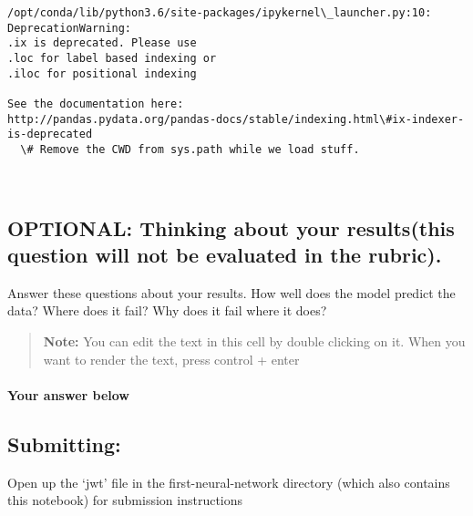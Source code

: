 \documentclass[11pt]{article}
\begin{document}
    \begin{Verbatim}[commandchars=\\\{\}]
/opt/conda/lib/python3.6/site-packages/ipykernel\_launcher.py:10: DeprecationWarning: 
.ix is deprecated. Please use
.loc for label based indexing or
.iloc for positional indexing

See the documentation here:
http://pandas.pydata.org/pandas-docs/stable/indexing.html\#ix-indexer-is-deprecated
  \# Remove the CWD from sys.path while we load stuff.

    \end{Verbatim}

    \begin{center}
    \end{center}
    { \hspace*{\fill} \\}
    
    \hypertarget{optional-thinking-about-your-resultsthis-question-will-not-be-evaluated-in-the-rubric.}{%
\subsection{OPTIONAL: Thinking about your results(this question will not
be evaluated in the
rubric).}\label{optional-thinking-about-your-resultsthis-question-will-not-be-evaluated-in-the-rubric.}}

Answer these questions about your results. How well does the model
predict the data? Where does it fail? Why does it fail where it does?

\begin{quote}
\textbf{Note:} You can edit the text in this cell by double clicking on
it. When you want to render the text, press control + enter
\end{quote}

\hypertarget{your-answer-below}{%
\paragraph{Your answer below}\label{your-answer-below}}

    \hypertarget{submitting}{%
\subsection{Submitting:}\label{submitting}}

Open up the `jwt' file in the first-neural-network directory (which also
contains this notebook) for submission instructions


    
    
    
    
\end{document}
